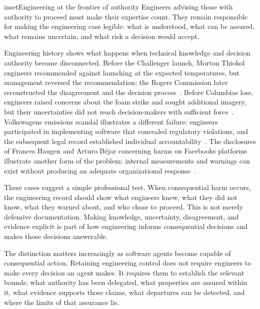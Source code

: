 



\begin{bookbox}{inset}{Engineering at the frontier of authority}
\label{inset-frontier-authority}
Engineers advising those with authority to proceed must make their expertise count. They remain responsible for making the engineering case legible: what is understood, what can be assured, what remains uncertain, and what risk a decision would accept.

Engineering history shows what happens when technical knowledge and decision authority become disconnected. Before the Challenger launch, Morton Thiokol engineers recommended against launching at the expected temperatures, but management reversed the recommendation; the Rogers Commission later reconstructed the disagreement and the decision process~\citep{rogers1986}. Before Columbia\textquotesingle s loss, engineers raised concerns about the foam strike and sought additional imagery, but their uncertainties did not reach decision-makers with sufficient force~\citep{caib2003}. Volkswagen\textquotesingle s emissions scandal illustrates a different failure: engineers participated in implementing software that concealed regulatory violations, and the subsequent legal record established individual accountability~\citep{doj-vw-liang}. The disclosures of Frances Haugen and Arturo Béjar concerning harms on Facebook\textquotesingle s platforms illustrate another form of the problem: internal measurements and warnings can exist without producing an adequate organizational response~\citep{senate-haugen2021, senate-bejar2023}.

These cases suggest a simple professional test. When consequential harm occurs, the engineering record should show what engineers knew, what they did not know, what they warned about, and who chose to proceed. This is not merely defensive documentation. Making knowledge, uncertainty, disagreement, and evidence explicit is part of how engineering informs consequential decisions and makes those decisions answerable.

The distinction matters increasingly as software agents become capable of consequential action. Retaining engineering control does not require engineers to make every decision an agent makes. It requires them to establish the relevant bounds: what authority has been delegated, what properties are assured within it, what evidence supports those claims, what departures can be detected, and where the limits of that assurance lie.


\end{bookbox}
